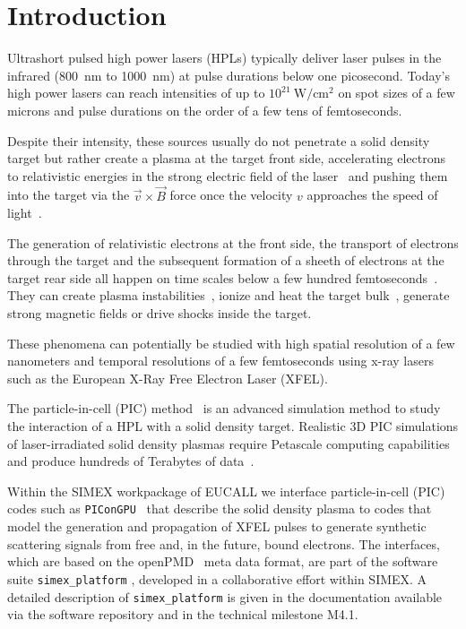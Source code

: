 \documentclass[12pt]{scrartcl}
\begin{document}
\section{Introduction} Ultrashort pulsed high power lasers (HPLs) typically deliver laser
pulses in the infrared (800~nm to 1000~nm) at pulse durations below one
picosecond. Today's high power lasers \cite{Siebold2008} can reach intensities of
up to $10^{21}~\text{W}/\text{cm}^2$ on spot sizes of a few microns and pulse
durations on the order of a few tens of femtoseconds.

Despite their intensity, these sources usually do not penetrate a solid density
target but rather create a plasma at the target front side, accelerating
electrons to relativistic energies in the strong electric field of the
laser~\cite{Kluge2011} and pushing them into the target via the
$\vec{v}\times\vec{B}$ force once the velocity $v$ approaches the speed of
light~\cite{Mulser2010,Gibbon1996}.

The generation of relativistic electrons at the front side, the transport of
electrons through the target and the subsequent formation of a sheeth of
electrons at the target rear side all happen on time scales below a few hundred
femtoseconds~\cite{Macchi2013}. They can create plasma
instabilities~\cite{Metzkes2014}, ionize and heat the target
bulk~\cite{Huang2013}, generate strong magnetic fields or drive shocks inside
the target.

These phenomena can potentially be studied with high spatial resolution of a few
nanometers and temporal resolutions of a few femtoseconds using x-ray
lasers~\cite{Kluge2014,Kluge2016} such as the European X-Ray Free Electron
Laser (XFEL).

The particle-in-cell (PIC) method~\cite{Birdsall2004} is an advanced simulation
method to study the interaction of a HPL with a solid density
target. Realistic 3D PIC simulations of laser-irradiated solid
density plasmas require Petascale computing capabilities and produce hundreds of
Terabytes of data~\cite{ornl_picongpu}.

Within the SIMEX workpackage of EUCALL we interface particle-in-cell (PIC) codes
such as \texttt{PIConGPU}~\cite{Bussmann2013, picongpu_github} that describe the solid density plasma to codes that
model the generation and propagation of XFEL pulses to
generate synthetic scattering signals from free and, in the future, bound
electrons. The interfaces, which are based on the openPMD~\cite{openPMD} meta data format, are
part of the software suite \texttt{simex\_platform} \cite{simex_github},
developed in a collaborative effort within SIMEX. A detailed description of
\texttt{simex\_platform} is given in the documentation available via the
software repository \cite{simex_github} and in the technical
milestone M4.1.
\end{document}
